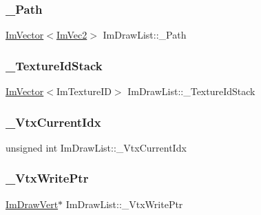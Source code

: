\hypertarget{struct_im_draw_list_a5bdc39abf351360500048628b8dc1b07}{}\label{struct_im_draw_list_a5bdc39abf351360500048628b8dc1b07} 
\subsubsection{\texorpdfstring{\+\_\+\+Path}{\_Path}}
{\footnotesize\ttfamily \hyperlink{class_im_vector}{Im\+Vector}$<$\hyperlink{struct_im_vec2}{Im\+Vec2}$>$ Im\+Draw\+List\+::\+\_\+\+Path}

\hypertarget{struct_im_draw_list_a848faddd121da050214b8d8159e5e704}{}\label{struct_im_draw_list_a848faddd121da050214b8d8159e5e704} 
\subsubsection{\texorpdfstring{\+\_\+\+Texture\+Id\+Stack}{\_TextureIdStack}}
{\footnotesize\ttfamily \hyperlink{class_im_vector}{Im\+Vector}$<$Im\+Texture\+ID$>$ Im\+Draw\+List\+::\+\_\+\+Texture\+Id\+Stack}

\hypertarget{struct_im_draw_list_a2228793183665bc3d8612795555fe505}{}\label{struct_im_draw_list_a2228793183665bc3d8612795555fe505} 
\subsubsection{\texorpdfstring{\+\_\+\+Vtx\+Current\+Idx}{\_VtxCurrentIdx}}
{\footnotesize\ttfamily unsigned int Im\+Draw\+List\+::\+\_\+\+Vtx\+Current\+Idx}

\hypertarget{struct_im_draw_list_a67f870f5140bf1cab14b8515b7386073}{}\label{struct_im_draw_list_a67f870f5140bf1cab14b8515b7386073} 
\subsubsection{\texorpdfstring{\+\_\+\+Vtx\+Write\+Ptr}{\_VtxWritePtr}}
{\footnotesize\ttfamily \hyperlink{struct_im_draw_vert}{Im\+Draw\+Vert}$\ast$ Im\+Draw\+List\+::\+\_\+\+Vtx\+Write\+Ptr}


